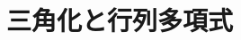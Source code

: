 \documentclass[../../topic_linear-algebra]{subfiles}
\begin{document}
\chapter{三角化と行列多項式}




\end{document}
